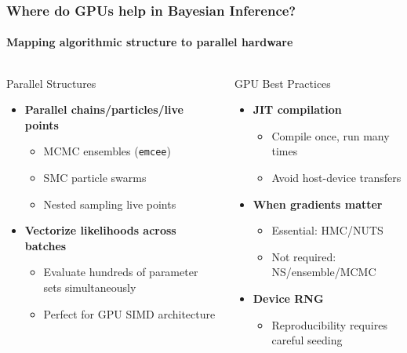 \documentclass[aspectratio=169]{beamer}
\begin{document}
\begin{frame}
    \frametitle{Where do GPUs help in Bayesian Inference?}
    \framesubtitle{Mapping algorithmic structure to parallel hardware}
    \begin{columns}
        \begin{block}{Parallel Structures}
            \begin{itemize}
                \item \textbf{Parallel chains/particles/live points}
                    \begin{itemize}
                        \item MCMC ensembles (\texttt{emcee})
                        \item SMC particle swarms
                        \item Nested sampling live points
                    \end{itemize}
                \item \textbf{Vectorize likelihoods across batches}
                    \begin{itemize}
                        \item Evaluate hundreds of parameter sets simultaneously
                        \item Perfect for GPU SIMD architecture
                    \end{itemize}
            \end{itemize}
        \end{block}
        \begin{block}{GPU Best Practices}
            \begin{itemize}
                \item \textbf{JIT compilation}
                    \begin{itemize}
                        \item Compile once, run many times
                        \item Avoid host-device transfers
                    \end{itemize}
                \item \textbf{When gradients matter}
                    \begin{itemize}
                        \item Essential: HMC/NUTS
                        \item Not required: NS/ensemble/MCMC
                    \end{itemize}
                \item \textbf{Device RNG}
                    \begin{itemize}
                        \item Reproducibility requires careful seeding
                    \end{itemize}
            \end{itemize}
        \end{block}
    \end{columns}
\end{frame}
\end{document}

